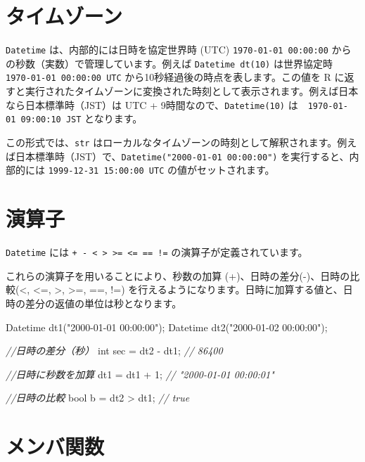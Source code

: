 \documentclass[]{book}
\newenvironment{Shaded}{\begin{snugshade}}{\end{snugshade}}
\newcommand{\CommentTok}[1]{\textcolor[rgb]{0.56,0.35,0.01}{\textit{#1}}}
\newcommand{\DataTypeTok}[1]{\textcolor[rgb]{0.13,0.29,0.53}{#1}}
\newcommand{\DecValTok}[1]{\textcolor[rgb]{0.00,0.00,0.81}{#1}}
\newcommand{\NormalTok}[1]{#1}
\newcommand{\StringTok}[1]{\textcolor[rgb]{0.31,0.60,0.02}{#1}}
\begin{document}
\section{タイムゾーン}

\texttt{Datetime} は、内部的には日時を協定世界時 (UTC) \texttt{1970-01-01\ 00:00:00} からの秒数（実数）で管理しています。例えば \texttt{Datetime\ dt(10)} は世界協定時 \texttt{1970-01-01\ 00:00:00\ UTC} から10秒経過後の時点を表します。この値を R に返すと実行されたタイムゾーンに変換された時刻として表示されます。例えば日本なら日本標準時（JST）は UTC + 9時間なので、\texttt{Datetime(10)} は　\texttt{1970-01-01\ 09:00:10\ JST} となります。

この形式では、\texttt{str} はローカルなタイムゾーンの時刻として解釈されます。例えば日本標準時（JST）で、\texttt{Datetime("2000-01-01\ 00:00:00")} を実行すると、内部的には \texttt{1999-12-31\ 15:00:00\ UTC} の値がセットされます。

\hypertarget{-2}{%
\section{演算子}\label{-2}}

\texttt{Datetime} には \texttt{+\ -\ \textless{}\ \textgreater{}\ \textgreater{}=\ \textless{}=\ ==\ !=} の演算子が定義されています。

これらの演算子を用いることにより、秒数の加算 (+)、日時の差分(-)、日時の比較(\textless{}, \textless{}=, \textgreater{}, \textgreater{}=, ==, !=) を行えるようになります。日時に加算する値と、日時の差分の返値の単位は秒となります。

\begin{Shaded}
\begin{Highlighting}[]
\NormalTok{Datetime dt1(}\StringTok{"2000-01-01 00:00:00"}\NormalTok{);}
\NormalTok{Datetime dt2(}\StringTok{"2000-01-02 00:00:00"}\NormalTok{);}

\CommentTok{//日時の差分（秒）}
\DataTypeTok{int}\NormalTok{ sec = dt2 - dt1;  }\CommentTok{// 86400}

\CommentTok{//日時に秒数を加算}
\NormalTok{dt1 = dt1 + }\DecValTok{1}\NormalTok{; }\CommentTok{// "2000-01-01 00:00:01"}

\CommentTok{//日時の比較}
\DataTypeTok{bool}\NormalTok{ b = dt2 > dt1; }\CommentTok{// true}
\end{Highlighting}
\end{Shaded}

\hypertarget{-3}{%
\section{メンバ関数}\label{-3}}
\end{document}
